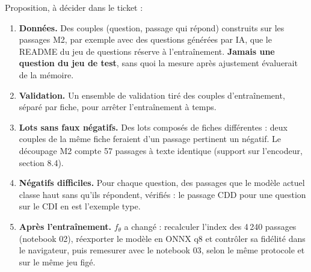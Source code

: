 Proposition, à décider dans le ticket :
\begin{enumerate}
\item \textbf{Données.} Des couples (question, passage qui répond) construits sur les passages M2, par exemple avec
  des questions générées par IA, que le README du jeu de questions réserve à l'entraînement. \textbf{Jamais une
  question du jeu de test}, sans quoi la mesure après ajustement évaluerait de la mémoire.
\item \textbf{Validation.} Un ensemble de validation tiré des couples d'entraînement, séparé par fiche, pour
  arrêter l'entraînement à temps.
\item \textbf{Lots sans faux négatifs.} Des lots composés de fiches différentes : deux couples de la même fiche
  feraient d'un passage pertinent un négatif. Le découpage M2 compte 57 passages à texte identique \mesure (support
  sur l'encodeur, section 8.4).
\item \textbf{Négatifs difficiles.} Pour chaque question, des passages que le modèle actuel classe haut sans qu'ils
  répondent, vérifiés : le passage CDD pour une question sur le CDI en est l'exemple type.
\item \textbf{Après l'entraînement.} $f_\theta$ a changé : recalculer l'index des 4\,240 passages (notebook 02),
  réexporter le modèle en ONNX q8 et contrôler sa fidélité dans le navigateur, puis remesurer avec le notebook 03,
  selon le même protocole et sur le même jeu figé.
\end{enumerate}

\begin{center}
\end{center}

